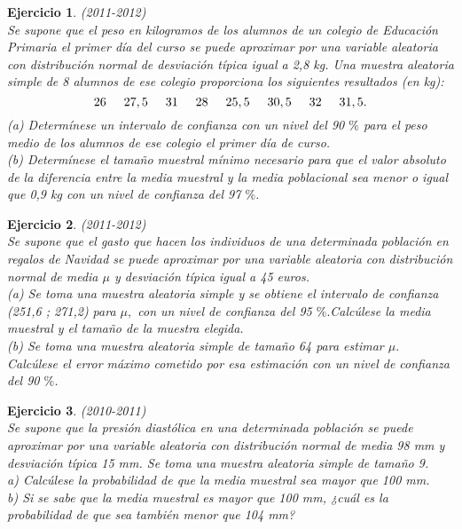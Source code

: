 \documentclass[12pt, a4paper]{amsart}
\newtheorem{ejer}{Ejercicio}
\begin{document}
\begin{ejer}\em (2011-2012)\\
Se supone que el peso en kilogramos de los alumnos de un colegio de Educación Primaria el
primer día del curso se puede aproximar por una variable aleatoria con distribución normal
de desviación típica igual a 2,8 kg. Una muestra aleatoria simple de 8 alumnos de ese colegio
proporciona los siguientes resultados (en kg):
\[26\hspace*{5mm} 27,5\hspace*{5mm} 31\hspace*{5mm} 28\hspace*{5mm} 25,5\hspace*{5mm} 30,5\hspace*{5mm} 32\hspace*{5mm} 31,5.\]
(a) Determínese un intervalo de confianza con un nivel del 90 $\%$ para el peso medio de los
alumnos de ese colegio el primer día de curso.\\
(b) Determínese el tamaño muestral mínimo necesario para que el valor absoluto de la
diferencia entre la media muestral y la media poblacional sea menor o igual que 0,9 kg
con un nivel de confianza del 97 $\%$. 
\end{ejer}

\begin{ejer}\em (2011-2012)\\
Se supone que el gasto que hacen los individuos de una determinada población en regalos de
Navidad se puede aproximar por una variable aleatoria con distribución normal de media $\mu$ y
desviación típica igual a 45 euros.\\
(a) Se toma una muestra aleatoria simple y se obtiene el intervalo de confianza (251,6 ; 271,2)
para $\mu,$ con un nivel de confianza del 95 $\%.$Calcúlese la media muestral y el tamaño de la
muestra elegida.\\
(b) Se toma una muestra aleatoria simple de tamaño 64 para estimar $\mu.$ Calcúlese el error
máximo cometido por esa estimación con un nivel de confianza del 90 $\%$. 
\end{ejer}

\begin{ejer}\em (2010-2011)\\
Se supone que la presión diastólica en una determinada población se puede aproximar por una variable aleatoria con distribución normal de media 98 mm y desviación típica 15 mm. Se toma una muestra aleatoria simple de tamaño 9.\\
a) Calcúlese la probabilidad de que la media muestral sea mayor que 100 mm.\\
b) Si se sabe que la media muestral es mayor que 100 mm, ¿cuál es la probabilidad de que sea también menor que 104 mm?
\end{ejer}
\end{document}
